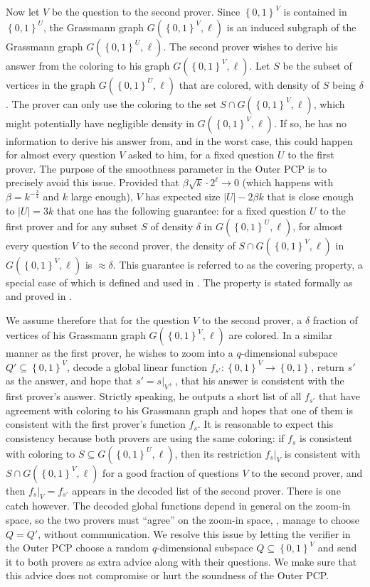 \documentclass{toc}
\newcommand\set[1]{{\left\{ #1 \right\}}}
\newcommand\power[1]{\set{0,1}^{#1}}
\begin{document}
Now let $V$ be the question to the second prover. Since $\power{V}$ is contained in $\power{U}$, the Grassmann graph $G(\power{V},\ell)$
is an induced subgraph of the Grassmann graph $G(\power{U},\ell)$. The second prover wishes to derive his answer from the coloring to his
 graph $G(\power{V},\ell)$. Let $S$ be the subset of vertices in the graph $G(\power{U},\ell)$ that are colored, with density of $S$ being
 $\delta$. The prover can only use the coloring to the set $S \cap G(\power{V},\ell)$, which might potentially have negligible density
  in $G(\power{V},\ell)$. If so, he has no information  to derive his answer from, and in the worst case, this could happen for almost every question
  $V$ asked to him, for a fixed question $U$ to the first prover. The purpose of the
  smoothness
  parameter in the Outer PCP is to
  precisely avoid this issue. Provided that $\beta \sqrt{k} \cdot 2^\ell \to 0$ (which happens with $\beta = k^{-\frac{3}{4}}$ and
  $k$ large enough), $V$ has expected size   $|U| - 2\beta k$ that is close enough to $|U| = 3k$ that
  one has the following guarantee: for a fixed question $U$ to the first prover and for any subset $S$ of density $\delta$ in
  $G(\power{U},\ell)$, for almost every question $V$ to the second prover, the density of $S \cap G(\power{V}, \ell)$ in $G(\power{V},\ell)$
  is $\approx \delta$. This guarantee is referred to as the
  covering property,
  a special case of which is defined and used in \cite{KS}.
  The property is stated formally as   %
and proved in .

 We assume therefore that for the question $V$ to the second prover,
  a %
 $\delta$ fraction of vertices of his Grassmann graph
 $G(\power{V},\ell)$ are colored. In a similar manner as the first prover, he wishes
to zoom into a $q$-dimensional subspace
 $Q' \subseteq \power{V}$, decode a global linear function $f_{s'}: \power{V} \to \power{}$, return $s'$ as the
 answer, and hope that $s' = s|_V$, \ie, that his answer is consistent with the first prover's answer. Strictly speaking,
 he outputs a short list of all $f_{s'}$ that have agreement with coloring to his Grassmann graph and hopes that one of them
 is consistent with the first prover's function $f_s$. It is reasonable to expect this consistency because both provers are using the same coloring:
 if $f_s$ is consistent with coloring to $S \subseteq G(\power{U},\ell)$, then its restriction $f_s|_V$
  is consistent with $S \cap G(\power{V},\ell)$ for a good fraction of questions $V$ to the second prover, and then
  $f_s|_V = f_{s'}$ appears in the decoded list of the second prover. There is one catch however.
  The decoded global functions depend in general on the zoom-in space, so the two provers
 must ``agree'' on the zoom-in space, \ie, manage to choose $Q=Q'$, without communication. We resolve this issue by letting the verifier
 in the Outer PCP choose a random $q$-dimensional subspace $Q \subseteq \power{V}$ and send it to both provers as extra
 advice
 along with their questions. We make sure that this advice does not compromise or hurt the soundness of the Outer PCP.
\end{document}
